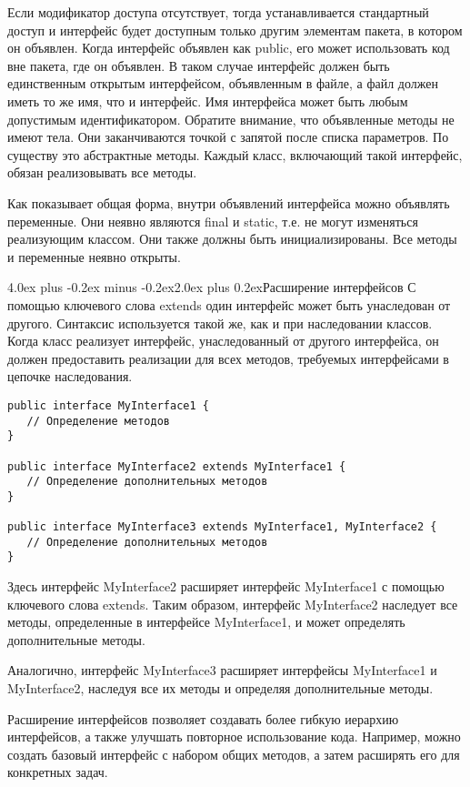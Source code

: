\documentclass[12pt, a4paper]{book}%
\makeatletter
\renewcommand{\section}{\@startsection{section}{1}{1pt}%
{4.0ex plus -0.2ex minus -0.2ex}{2.0ex plus 0.2ex}{\centering\bf}}%
\makeatother
\begin{document}
{Если модификатор доступа отсутствует, тогда устанавливается стандартный доступ и интерфейс будет доступным только другим элементам пакета, в котором он объявлен. Когда интерфейс объявлен как public, его может использовать код вне пакета, где он объявлен. В таком случае интерфейс должен быть единственным открытым интерфейсом, объявленным в файле, а файл должен иметь то же имя, что и интерфейс. Имя интерфейса может быть любым допустимым идентификатором. Обратите внимание, что объявленные методы не имеют тела. Они заканчиваются точкой с запятой после списка параметров. По существу это абстрактные методы. Каждый класс, включающий такой интерфейс, обязан реализовывать все методы.

Как показывает общая форма, внутри объявлений интерфейса можно объявлять переменные. Они неявно являются final и static, т.е. не могут изменяться реализующим классом. Они также должны быть инициализированы. Все методы и переменные неявно открыты.

\section{Расширение интерфейсов}
С помощью ключевого слова extends один интерфейс может быть унаследован от другого. Синтаксис используется такой же, как и при наследовании классов. Когда класс реализует интерфейс, унаследованный от другого интерфейса, он должен предоставить реализации для всех методов, требуемых интерфейсами в цепочке наследования. 

\begin{lstlisting}
public interface MyInterface1 {
   // Определение методов
}

public interface MyInterface2 extends MyInterface1 {
   // Определение дополнительных методов
}

public interface MyInterface3 extends MyInterface1, MyInterface2 {
   // Определение дополнительных методов
}
\end{lstlisting}

Здесь интерфейс MyInterface2 расширяет интерфейс MyInterface1 с помощью ключевого слова extends. Таким образом, интерфейс MyInterface2 наследует все методы, определенные в интерфейсе MyInterface1, и может определять дополнительные методы.

Аналогично, интерфейс MyInterface3 расширяет интерфейсы MyInterface1 и MyInterface2, наследуя все их методы и определяя дополнительные методы.

Расширение интерфейсов позволяет создавать более гибкую иерархию интерфейсов, а также улучшать повторное использование кода. Например, можно создать базовый интерфейс с набором общих методов, а затем расширять его для конкретных задач.

}
\end{document}
